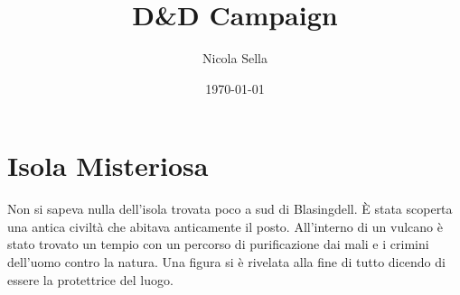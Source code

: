 \documentclass[10pt,twoside,twocolumn]{article}
\title{D\&D Campaign}
\author{Nicola Sella}
\date{\today}
\begin{document}
\maketitle

\tableofcontents

\selectfont %

\section{Isola Misteriosa}
Non si sapeva nulla dell'isola trovata poco a sud di Blasingdell.
\`E stata scoperta una antica civilt\`a che abitava anticamente il posto.
All'interno di un vulcano \`e stato trovato un tempio con un percorso di
purificazione dai mali e i crimini dell'uomo contro la natura. Una figura si \`e
rivelata alla fine di tutto dicendo di essere la protettrice del luogo.
\end{document}
